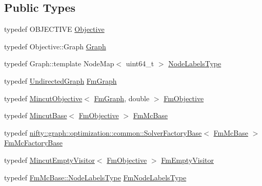 \subsection*{Public Types}
\begin{DoxyCompactItemize}
\item 
typedef O\+B\+J\+E\+C\+T\+I\+V\+E \hyperlink{classnifty_1_1graph_1_1optimization_1_1mincut_1_1MincutCcFusionMove_aceb1de59706d17aba8d8fa6c23d9d01b}{Objective}
\item 
typedef Objective\+::\+Graph \hyperlink{classnifty_1_1graph_1_1optimization_1_1mincut_1_1MincutCcFusionMove_a046fcef6e07277b118e6e0b42417b47e}{Graph}
\item 
typedef Graph\+::template Node\+Map$<$ uint64\+\_\+t $>$ \hyperlink{classnifty_1_1graph_1_1optimization_1_1mincut_1_1MincutCcFusionMove_afa2e5afc13c945eac0fe59c2691f43c7}{Node\+Labels\+Type}
\item 
typedef \hyperlink{classnifty_1_1graph_1_1UndirectedGraph}{Undirected\+Graph} \hyperlink{classnifty_1_1graph_1_1optimization_1_1mincut_1_1MincutCcFusionMove_ac860fa28428c98762c73fd61e876a3d5}{Fm\+Graph}
\item 
typedef \hyperlink{classnifty_1_1graph_1_1optimization_1_1mincut_1_1MincutObjective}{Mincut\+Objective}$<$ \hyperlink{classnifty_1_1graph_1_1optimization_1_1mincut_1_1MincutCcFusionMove_ac860fa28428c98762c73fd61e876a3d5}{Fm\+Graph}, double $>$ \hyperlink{classnifty_1_1graph_1_1optimization_1_1mincut_1_1MincutCcFusionMove_af3e387f919e56c6411c67533aa781686}{Fm\+Objective}
\item 
typedef \hyperlink{classnifty_1_1graph_1_1optimization_1_1mincut_1_1MincutBase}{Mincut\+Base}$<$ \hyperlink{classnifty_1_1graph_1_1optimization_1_1mincut_1_1MincutCcFusionMove_af3e387f919e56c6411c67533aa781686}{Fm\+Objective} $>$ \hyperlink{classnifty_1_1graph_1_1optimization_1_1mincut_1_1MincutCcFusionMove_a02b2a1017ae611b64c9b1126214aa466}{Fm\+Mc\+Base}
\item 
typedef \hyperlink{classnifty_1_1graph_1_1optimization_1_1common_1_1SolverFactoryBase}{nifty\+::graph\+::optimization\+::common\+::\+Solver\+Factory\+Base}$<$ \hyperlink{classnifty_1_1graph_1_1optimization_1_1mincut_1_1MincutCcFusionMove_a02b2a1017ae611b64c9b1126214aa466}{Fm\+Mc\+Base} $>$ \hyperlink{classnifty_1_1graph_1_1optimization_1_1mincut_1_1MincutCcFusionMove_aa1890aca393a3d5f4ee342304d74ddba}{Fm\+Mc\+Factory\+Base}
\item 
typedef \hyperlink{namespacenifty_1_1graph_1_1optimization_1_1mincut_aac5eb28bbe885fb25185ac51f2afca82}{Mincut\+Empty\+Visitor}$<$ \hyperlink{classnifty_1_1graph_1_1optimization_1_1mincut_1_1MincutCcFusionMove_af3e387f919e56c6411c67533aa781686}{Fm\+Objective} $>$ \hyperlink{classnifty_1_1graph_1_1optimization_1_1mincut_1_1MincutCcFusionMove_a1dfcd29b86c1bf2a8d17374026b2b263}{Fm\+Empty\+Visitor}
\item 
typedef \hyperlink{classnifty_1_1graph_1_1optimization_1_1common_1_1SolverBase_a6e4e465f3b6e039882669fcfb9714818}{Fm\+Mc\+Base\+::\+Node\+Labels\+Type} \hyperlink{classnifty_1_1graph_1_1optimization_1_1mincut_1_1MincutCcFusionMove_aa8bd6f10d00805a7aa2151ec3cb813f1}{Fm\+Node\+Labels\+Type}
\end{DoxyCompactItemize}
